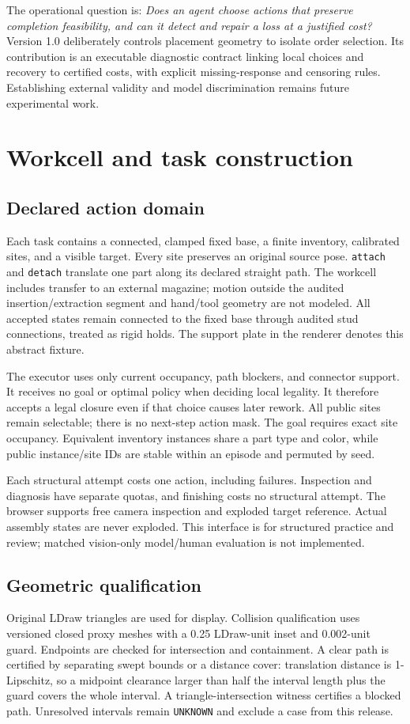 \documentclass[10pt,twocolumn]{article}
\begin{document}
The operational question is: \emph{Does an agent choose actions that preserve
completion feasibility, and can it detect and repair a loss at a justified cost?}
Version 1.0 deliberately controls placement geometry to isolate order selection.
Its contribution is an executable diagnostic contract linking local choices
and recovery to certified costs, with explicit missing-response and censoring
rules. Establishing external validity and model discrimination remains future
experimental work.

\section{Workcell and task construction}
\subsection{Declared action domain}
Each task contains a connected, clamped fixed base, a finite inventory, calibrated
sites, and a visible target. Every site preserves an original source pose.
\texttt{attach} and \texttt{detach} translate one part along its declared straight
path. The workcell includes transfer to an external magazine; motion outside
the audited insertion/extraction segment and hand/tool geometry are not modeled.
All accepted states remain connected to the fixed base through audited stud
connections, treated as rigid holds. The support plate in the renderer denotes
this abstract fixture.

The executor uses only current occupancy, path blockers, and connector support.
It receives no goal or optimal policy when deciding local legality. It therefore
accepts a legal closure even if that choice causes later rework. All public sites
remain selectable; there is no next-step action mask. The goal requires exact
site occupancy. Equivalent inventory instances share a part type and color,
while public instance/site IDs are stable within an episode and permuted by seed.

Each structural attempt costs one action, including failures. Inspection and
diagnosis have separate quotas, and finishing costs no structural attempt.
The browser supports free camera inspection and exploded target reference.
Actual assembly states are never exploded. This interface is for structured
practice and review; matched vision-only model/human evaluation is not implemented.

\subsection{Geometric qualification}
Original LDraw triangles are used for display. Collision qualification uses
versioned closed proxy meshes with a 0.25 LDraw-unit inset and 0.002-unit guard.
Endpoints are checked for intersection and containment. A clear path is certified
by separating swept bounds or a distance cover: translation distance is
1-Lipschitz, so a midpoint clearance larger than half the interval length plus
the guard covers the whole interval. A triangle-intersection witness certifies
a blocked path. Unresolved intervals remain \texttt{UNKNOWN} and exclude a case
from this release.
\end{document}
